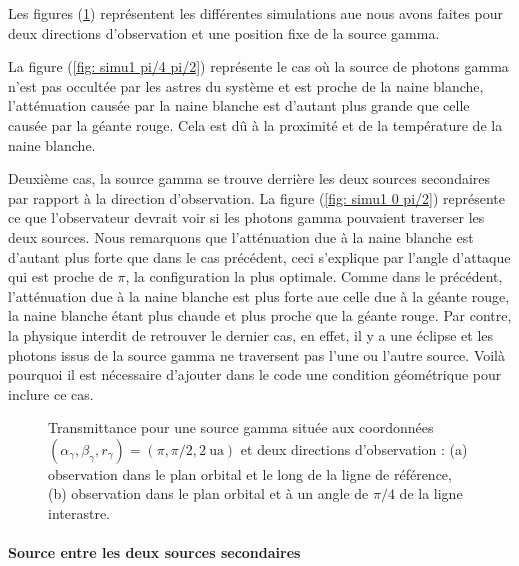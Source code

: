 \documentclass[a4paper,12pt,twoside]{article}
\begin{document}
Les figures (\ref{fig: simu1 resultat}) représentent les différentes simulations aue nous avons faites pour deux directions d'observation et une position fixe de la source gamma.

La figure (\ref{fig: simu1 pi/4 pi/2}) représente le cas où la source de photons gamma n'est pas occultée par les astres du système et est proche de la naine blanche, l'atténuation causée par la naine blanche est d'autant plus grande que celle causée par la géante rouge. Cela est dû à la proximité et de la température de la naine blanche.

Deuxième cas, la source gamma se trouve derrière les deux sources secondaires par rapport à la direction d'observation. La figure (\ref{fig: simu1 0 pi/2}) représente ce que l'observateur devrait voir si les photons gamma pouvaient traverser les deux sources. Nous remarquons que l'atténuation due à la naine blanche est d'autant plus forte que dans le cas précédent, ceci s'explique par l'angle d'attaque qui est proche de $\pi$, la configuration la plus optimale. Comme dans le précédent, l'atténuation due à la naine blanche est plus forte aue celle due à la géante rouge, la naine blanche étant plus chaude et plus proche que la géante rouge. Par contre, la physique interdit de retrouver le dernier cas, en effet, il y a une éclipse et les photons issus de la source gamma ne traversent pas l'une ou l'autre source. Voilà pourquoi il est nécessaire d'ajouter dans le code une condition géométrique pour inclure ce cas.

\begin{figure}[H]
	\centering
    \hfill
    \hfill
    \caption{Transmittance pour une source gamma située aux coordonnées $(\alpha_\gamma, \beta_\gamma, r_\gamma) = (\pi, \pi/2, \SI{2}{\astronomicalunit})$ et deux directions d'observation : (a) observation dans le plan orbital et le long de la ligne de référence, (b) observation dans le plan orbital et à un angle de $\pi/4$ de la ligne interastre.}
    \label{fig: simu1 resultat}
\end{figure}

\paragraph*{Source entre les deux sources secondaires} \hspace{0pt} \\
\end{document}
